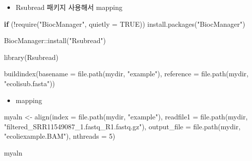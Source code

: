 \documentclass[
]{book}
\newenvironment{Shaded}{\begin{snugshade}}{\end{snugshade}}
\newcommand{\AttributeTok}[1]{\textcolor[rgb]{0.77,0.63,0.00}{#1}}
\newcommand{\ConstantTok}[1]{\textcolor[rgb]{0.00,0.00,0.00}{#1}}
\newcommand{\ControlFlowTok}[1]{\textcolor[rgb]{0.13,0.29,0.53}{\textbf{#1}}}
\newcommand{\DecValTok}[1]{\textcolor[rgb]{0.00,0.00,0.81}{#1}}
\newcommand{\FunctionTok}[1]{\textcolor[rgb]{0.00,0.00,0.00}{#1}}
\newcommand{\NormalTok}[1]{#1}
\newcommand{\OtherTok}[1]{\textcolor[rgb]{0.56,0.35,0.01}{#1}}
\newcommand{\SpecialCharTok}[1]{\textcolor[rgb]{0.00,0.00,0.00}{#1}}
\newcommand{\StringTok}[1]{\textcolor[rgb]{0.31,0.60,0.02}{#1}}
\providecommand{\tightlist}{%
  \setlength{\itemsep}{0pt}\setlength{\parskip}{0pt}}
\begin{document}
\begin{itemize}
\tightlist
\item
  Rsubread 패키지 사용해서 mapping
\end{itemize}

\begin{Shaded}
\begin{Highlighting}[]
\ControlFlowTok{if}\NormalTok{ (}\SpecialCharTok{!}\FunctionTok{require}\NormalTok{(}\StringTok{"BiocManager"}\NormalTok{, }\AttributeTok{quietly =} \ConstantTok{TRUE}\NormalTok{))}
    \FunctionTok{install.packages}\NormalTok{(}\StringTok{"BiocManager"}\NormalTok{)}

\NormalTok{BiocManager}\SpecialCharTok{::}\FunctionTok{install}\NormalTok{(}\StringTok{"Rsubread"}\NormalTok{)}
\end{Highlighting}
\end{Shaded}

\begin{Shaded}
\begin{Highlighting}[]
\FunctionTok{library}\NormalTok{(Rsubread)}

\FunctionTok{buildindex}\NormalTok{(}\AttributeTok{basename =} \FunctionTok{file.path}\NormalTok{(mydir, }\StringTok{"example"}\NormalTok{),}
           \AttributeTok{reference =} \FunctionTok{file.path}\NormalTok{(mydir, }\StringTok{"ecolisub.fasta"}\NormalTok{))}
\end{Highlighting}
\end{Shaded}

\begin{itemize}
\tightlist
\item
  mapping
\end{itemize}

\begin{Shaded}
\begin{Highlighting}[]
\NormalTok{myaln }\OtherTok{\textless{}{-}} \FunctionTok{align}\NormalTok{(}\AttributeTok{index =} \FunctionTok{file.path}\NormalTok{(mydir, }\StringTok{"example"}\NormalTok{),}
               \AttributeTok{readfile1 =} \FunctionTok{file.path}\NormalTok{(mydir, }\StringTok{"filtered\_SRR11549087\_1.fastq\_R1.fastq.gz"}\NormalTok{),}
               \AttributeTok{output\_file =} \FunctionTok{file.path}\NormalTok{(mydir, }\StringTok{"ecoliexample.BAM"}\NormalTok{),}
               \AttributeTok{nthreads =} \DecValTok{5}\NormalTok{)}


\NormalTok{myaln}
\end{Highlighting}
\end{Shaded}
\end{document}
